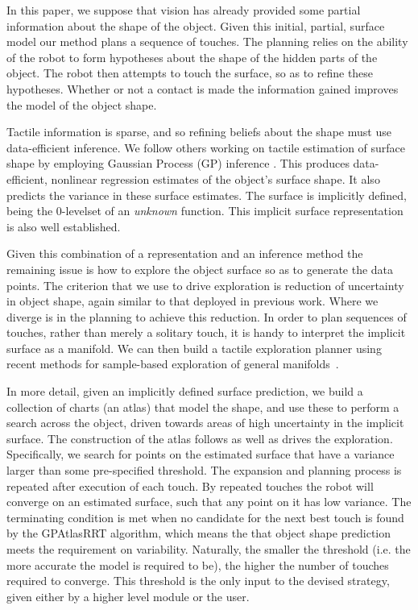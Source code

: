 In this paper, we suppose that vision has already provided some partial information about the shape of the object. Given this initial, partial, surface model our method plans a  sequence of touches. The planning relies on the ability of the robot to form hypotheses about the shape of the hidden parts of the object. The robot then attempts to touch the surface, so as to refine these hypotheses. Whether or not a contact is made the information gained improves the model of the object shape.

Tactile information is sparse, and so refining beliefs about the shape must use data-efficient inference. We follow others working on tactile estimation of surface shape \cite{Dragiev2011Gaussian,Bjorkman2013Enhancing,Sommer2014Bimanual} by employing Gaussian Process (GP) inference \cite{Rasmussen2006Gaussian}.  This produces data-efficient, nonlinear regression estimates of the object's surface shape. It also predicts the variance in these surface estimates. The surface is implicitly defined, being the $0$-levelset of an \emph{unknown} function. This implicit surface representation is also well established.

Given this combination of a representation and an inference method the remaining issue is how to explore the object surface so as to generate the data points. The criterion that we use to drive exploration is reduction of uncertainty in object shape, again similar to that deployed in previous work. Where we diverge is in the planning to achieve this reduction. In order to plan sequences of touches, rather than merely a solitary touch, it is handy to interpret the implicit surface as a manifold. We can then build a tactile exploration planner using recent methods for sample-based exploration of general manifolds~\cite{Jaillet2013Path}. 

In more detail, given an implicitly defined surface prediction, we build a collection of charts (an atlas) that model the shape, and use these to perform a search across the object, driven towards areas of high uncertainty in the implicit surface. The construction of the atlas follows as well as drives the exploration. Specifically, we search for points on the estimated surface that have a variance larger than some pre-specified threshold. The expansion and planning process is repeated after execution of each touch. By repeated touches the robot will converge on an estimated surface, such that any point on it has low variance. The terminating condition is met when no candidate for the next best touch is found by the GPAtlasRRT algorithm, which means the that object shape prediction meets the requirement on variability. Naturally, the smaller the threshold (i.e. the more accurate the model is required to be), the higher the number of touches required to converge. This threshold is the only input to the devised strategy, given either by a higher level module or the user.

